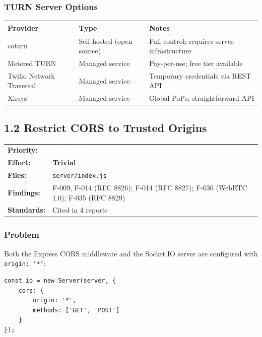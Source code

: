 \documentclass[11pt,letterpaper]{article}
\newcommand{\pricritical}{\colorbox{critical}{\textcolor{white}{\small\textbf{CRITICAL}}}}
\newcommand{\efftrivial}{\colorbox{compliant!20}{\small\textbf{Trivial}}}
\begin{document}
\subsubsection{TURN Server Options}

\begin{center}
\begin{tabularx}{\textwidth}{L{3cm}L{4cm}L{6cm}}
\toprule
\textbf{Provider} & \textbf{Type} & \textbf{Notes} \\
\midrule
coturn & Self-hosted (open source) & Full control; requires server infrastructure \\
Metered TURN & Managed service & Pay-per-use; free tier available \\
Twilio Network Traversal & Managed service & Temporary credentials via REST API \\
Xirsys & Managed service & Global PoPs; straightforward API \\
\bottomrule
\end{tabularx}
\end{center}

\newpage

\subsection{1.2 Restrict CORS to Trusted Origins}

\begin{tabular}{ll}
\textbf{Priority:} & \pricritical \\
\textbf{Effort:} & \efftrivial \\
\textbf{Files:} & \texttt{server/index.js} \\
\textbf{Findings:} & F-009, F-014 (RFC 8826); F-014 (RFC 8827); F-030 (WebRTC 1.0); F-035 (RFC 8829) \\
\textbf{Standards:} & Cited in 4 reports \\
\end{tabular}

\subsubsection{Problem}

Both the Express CORS middleware and the Socket.IO server are configured with \texttt{origin: '*'}:

\begin{verbatim}
const io = new Server(server, {
    cors: {
        origin: '*',
        methods: ['GET', 'POST']
    }
});
\end{verbatim}
\end{document}
